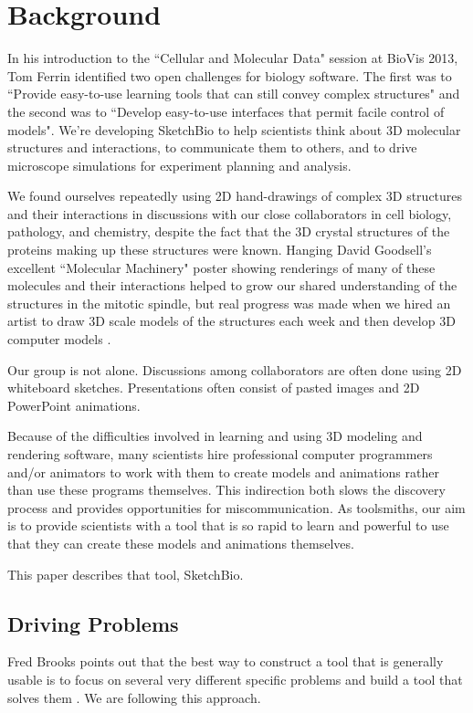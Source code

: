 \documentclass[twocolumn]{bmcart}%
\begin{document}


\section*{Background}

In his introduction to the ``Cellular and Molecular Data" session at BioVis 2013, Tom Ferrin identified two open challenges for biology software.
The first was to ``Provide easy-to-use learning tools that can still convey complex structures" and the second was to ``Develop easy-to-use interfaces that permit facile control of models".
We’re developing SketchBio to help scientists think about 3D molecular structures and interactions, to communicate them to others, and to drive microscope simulations for experiment planning and analysis.

We found ourselves repeatedly using 2D hand-drawings of complex 3D structures and their interactions in discussions with our close collaborators in cell biology, pathology, and chemistry, despite the fact that the 3D crystal structures of the proteins making up these structures were known.
Hanging David Goodsell's excellent ``Molecular Machinery" poster \cite{Goodsell} showing renderings of many of these molecules and their interactions helped to grow our shared understanding of the structures in the mitotic spindle, but real progress was made when we hired an artist to draw 3D scale models of the structures each week and then develop 3D computer models \cite{taylor2012}.

Our group is not alone.  Discussions among collaborators are often done using 2D whiteboard sketches.  Presentations often consist of pasted images and 2D PowerPoint animations.

Because of the difficulties involved in learning and using 3D modeling and rendering software, many scientists hire professional computer programmers and/or animators to work with them to create models and animations rather than use these programs themselves.
This indirection both slows the discovery process and provides opportunities for miscommunication.
As toolsmiths, our aim is to provide scientists with a tool that is so rapid to learn and powerful to use that they can create these models and animations themselves.

This paper describes that tool, SketchBio.

\subsection*{Driving Problems}
Fred Brooks points out that the best way to construct a tool that is generally usable is to focus on several very different specific problems and build a tool that solves them \cite{Brooks}.
We are following this approach.
\end{document}
